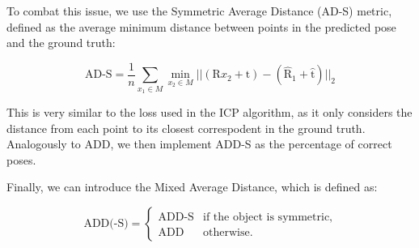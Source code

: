 To combat this issue, we use the Symmetric Average Distance (AD-S)\cite{PoseCNN} metric, defined as the average minimum distance between points in the predicted pose and the ground truth:

\begin{equation*}
    \text{AD-S} = \frac{1}{n} \sum_{x_1 \in M} \min_{x_2 \in M} ||(\text{R}x_2 + \text{t}) - 
    (\hat{\text{R}}_1 + \hat{\text{t}})||_2
\end{equation*}

This is very similar to the loss used in the ICP algorithm, as it only considers the distance from each point to its closest correspodent in the ground truth. Analogously to ADD, we then implement ADD-S as the percentage of correct poses.

Finally, we can introduce the Mixed Average Distance, which is defined as:

\begin{equation*}
    \text{ADD(-S)} = 
    \begin{cases}
        \text{ADD-S} & \text{if the object is symmetric,}\\
        \text{ADD} & \text{otherwise.}
    \end{cases}
\end{equation*}